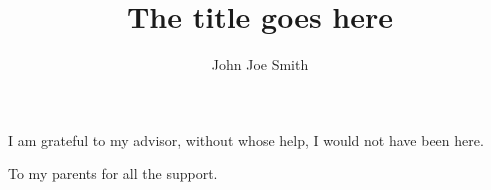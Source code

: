 \documentclass[oneside,final, letterpaper]{ucr}
\begin{document}

\title{The title goes here}
\author{John Joe Smith}

\maketitle
\copyrightpage{}
\approvalpage{}


\begin{frontmatter}

\begin{acknowledgements}
I am grateful to my advisor, without whose help, I would not have been here.
\end{acknowledgements}

\begin{dedication}
\null\vfil
{\large
\begin{center}
To my parents for all the support.
\end{center}}
\vfil\null
\end{dedication}



\tableofcontents
\listoffigures
\listoftables
\end{frontmatter}










\nocite{*}
% 




\end{document}
